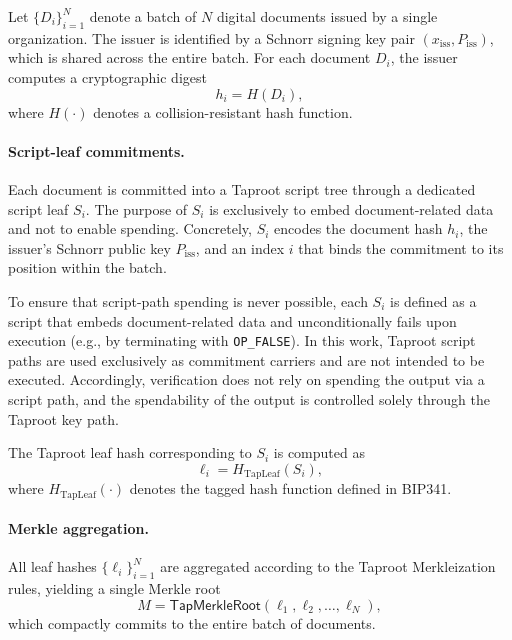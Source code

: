 \documentclass{ieeeaccess}
\begin{document}
Let $\{D_i\}_{i=1}^{N}$ denote a batch of $N$ digital documents issued by a single organization.
The issuer is identified by a Schnorr signing key pair $(x_{\mathrm{iss}}, P_{\mathrm{iss}})$, which is shared across the entire batch.
For each document $D_i$, the issuer computes a cryptographic digest
\begin{equation}
h_i = H(D_i),
\label{eq:doc_hash}
\end{equation}
where $H(\cdot)$ denotes a collision-resistant hash function.

\paragraph{Script-leaf commitments.}
Each document is committed into a Taproot script tree through a dedicated script leaf $S_i$.
The purpose of $S_i$ is exclusively to embed document-related data and not to enable spending.
Concretely, $S_i$ encodes the document hash $h_i$, the issuer’s Schnorr public key $P_{\mathrm{iss}}$, and an index $i$ that binds the commitment to its position within the batch.

To ensure that script-path spending is never possible, each $S_i$ is defined as a script that embeds document-related data and unconditionally fails upon execution (e.g., by terminating with \texttt{OP\_FALSE}).
In this work, Taproot script paths are used exclusively as commitment carriers and are not intended to be executed.
Accordingly, verification does not rely on spending the output via a script path, and the spendability of the output is controlled solely through the Taproot key path.

The Taproot leaf hash corresponding to $S_i$ is computed as
\begin{equation}
\ell_i = H_{\text{TapLeaf}}(S_i),
\label{eq:tapleaf}
\end{equation}
where $H_{\text{TapLeaf}}(\cdot)$ denotes the tagged hash function defined in BIP341.

\paragraph{Merkle aggregation.}
All leaf hashes $\{\ell_i\}_{i=1}^{N}$ are aggregated according to the Taproot Merkleization rules, yielding a single Merkle root
\begin{equation}
M = \textsf{TapMerkleRoot}(\ell_1,\ell_2,\ldots,\ell_N),
\label{eq:merkle_root}
\end{equation}
which compactly commits to the entire batch of documents.
\end{document}
